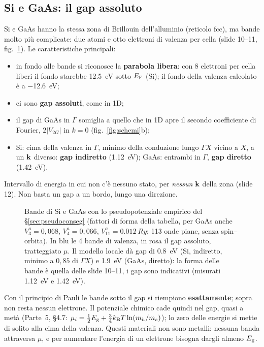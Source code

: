 \documentclass[11pt,a4paper]{article}
\begin{document}
\subsection{Si e GaAs: il gap assoluto}\label{sec:gapass}
Si e GaAs hanno la stessa zona di Brillouin dell'alluminio (reticolo fcc), ma bande molto più complicate: due atomi e otto elettroni di valenza per
cella (slide 10--11, fig.~\ref{fig:epm}). Le caratteristiche principali:
\begin{itemize}[leftmargin=*]
\item in fondo alle bande si riconosce la \textbf{parabola libera}: con 8 elettroni per cella liberi il fondo starebbe \SI{12.5}{eV} sotto $E_{\mathrm F}$
(Si); il fondo della valenza calcolato è a \SI{-12.6}{eV};
\item ci sono \textbf{gap assoluti}, come in 1D;
\item il gap di GaAs in $\Gamma$ somiglia a quello che in 1D apre il secondo coefficiente di Fourier, $2|V_{2G}|$ in $k=0$ (fig.~\ref{fig:schemi}b);
\item Si: cima della valenza in $\Gamma$, minimo della conduzione lungo $\Gamma X$ vicino a $X$, a un $\mathbf k$ diverso: \textbf{gap indiretto}
(\SI{1.12}{eV}); GaAs: entrambi in $\Gamma$, \textbf{gap diretto} (\SI{1.42}{eV}).
\end{itemize}

\begin{definizione}
Intervallo di energia in cui non c'è nessuno stato, per \emph{nessun} $\mathbf k$ della zona (slide 12). Non basta un gap a un bordo, lungo una direzione.
\end{definizione}

\begin{figure}[tbp]
\centering
{}
\caption{Bande di Si e GaAs con lo pseudopotenziale empirico del §\ref{sec:pseudoconseg} (fattori di forma della tabella, per GaAs anche
$V^a_3=0{,}068$, $V^a_4=0{,}066$, $V^a_{11}=\SI{0.012}{Ry}$; 113 onde piane, senza spin--orbita). In blu le 4 bande di valenza, in rosa il gap
assoluto, tratteggiato $\mu$. Il modello locale dà gap di \SI{0.8}{eV} (Si, indiretto, minimo a $0{,}85$ di $\Gamma X$) e \SI{1.9}{eV} (GaAs,
diretto): la forma delle bande è quella delle slide 10--11, i gap sono indicativi (misurati \SI{1.12}{eV} e \SI{1.42}{eV}).}\label{fig:epm}
\end{figure}

Con il principio di Pauli le bande sotto il gap si riempiono \textbf{esattamente}; sopra non resta nessun elettrone. Il potenziale chimico cade quindi
nel gap, quasi a metà (Parte~5, §4.7: $\mu_i=\frac12E_{\mathrm g}+\frac34k_{\mathrm B} T\ln(m_h/m_e)$); lo zero delle energie si mette di solito alla cima della
valenza. Questi materiali non sono metalli: nessuna banda attraversa $\mu$, e per aumentare l'energia di un elettrone bisogna dargli almeno $E_{\mathrm g}$.
\end{document}
